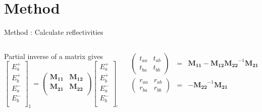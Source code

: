 \documentclass[aspectratio=169]{beamer}
\begin{document}
\section{Method}

\begin{frame}{Method : Calculate reflectivities}
	\begin{columns}
		\begin{column}{0.5\textwidth}
			Partial inverse of a matrix gives
			\begin{equation*}
			\begin{bmatrix}
			E_a^+ \\
			E_b^+ \\
			E_a^- \\
			E_b^- \\
			\end{bmatrix}_{1} = \begin{pmatrix}
			\bm{M_{11}} & \bm{M_{12}}\\
			\bm{M_{21}} & \bm{M_{22}}\\
			\end{pmatrix}\begin{bmatrix}
			E_a^+ \\
			E_b^+ \\
			E_a^- \\
			E_b^- \\
			\end{bmatrix}_{0}
			\end{equation*}
		\end{column}
		\begin{column}{0.5\textwidth}
			\begin{eqnarray*}
				\begin{pmatrix}
					t_{aa} & t_{ab} \\
					t_{ba} & t_{bb}
				\end{pmatrix} &=& \bm{M_{11}} - \bm{M_{12}}\bm{M_{22}}^{-1}\bm{M_{21}}\\
				\begin{pmatrix}
					r_{aa} & r_{ab} \\
					r_{ba} & r_{bb}
				\end{pmatrix} &=& -\bm{M_{22}}^{-1}\bm{M_{21}}
			\end{eqnarray*}
		\end{column}
	\end{columns}
\end{frame}
\end{document}
